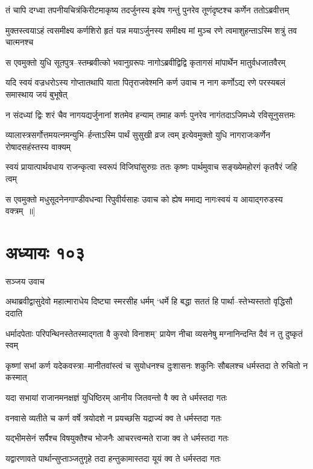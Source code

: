 \twolineshloka
{तं चापि दग्ध्वा तपनीयचित्रंकिरीटमाकृष्य तदर्जुनस्य}
{इयेष गन्तुं पुनरेव तूणंदृष्टश्च कर्णेन ततोऽब्रवीत्तम्}


\twolineshloka
{मुक्तस्त्वयाऽहं त्वसमीक्ष्य कर्णशिरो हृतं यन्न मयाऽर्जुनस्य}
{समीक्ष्य मां मुञ्च रणे त्वमाशुहन्ताऽस्मि शत्रुं तव चात्मनश्च}


\twolineshloka
{स एवमुक्तो युधि सूतपुत्र--स्तम्ब्रवीत्को भवानुग्ररूपः}
{नागोऽब्रवीद्विद्वि कृतागसं मांपार्थेन मातुर्वधजातवैरम्}


\threelineshloka
{यदि स्वयं वज्रधरोऽस्य गोप्तातथापि याता पितृराजवेश्मनि}
{कर्ण उवाच}
{न नाग कर्णोऽद्य रणे परस्यबलं समास्थाय जयं बुभूषेत्}


\twolineshloka
{न संदध्यां द्विः शरं चैव नागयद्यर्जुनानां शतमेव हन्याम्}
{तमाह कर्णः पुनरेव नागंतदाऽजिमध्ये रविसूनुसत्तमः}


\twolineshloka
{व्यालास्त्रसर्गोत्तमयत्नमन्युभि--र्हन्ताऽस्मि पार्थं सुसुखी व्रज त्वम्}
{इत्येवमुक्तो युधि नागराजःकर्णेन रोषादसहंस्तस्य वाक्यम्}


\twolineshloka
{स्वयं प्रायात्पार्थवधाय राजन्कृत्वा स्वरूपं विजिघांसुरुग्रः}
{ततः कृष्णः पार्थमुवाच सङ्ख्येमहोरगं कृतवैरं जहि त्वम्}


\twolineshloka
{स एवमुक्तो मधुसूदनेनगाण्डीवधन्वा रिपुवीर्यसाहः}
{उवाच को ह्येष ममाद्य नागःस्वयं य आयाद्गरुडस्य वक्त्रम् ॥]}


\chapter{अध्यायः १०३}
\twolineshloka
{सञ्जय उवाच}
{}


\twolineshloka
{अथाब्रवीद्वासुदेवो महात्माराधेय दिष्ट्या स्मरसीह धर्मम्}
{`धर्मे हि बद्धा सततं हि पार्था--स्तेभ्यस्ततो वृद्धिसौ ददाति}


\twolineshloka
{धर्मादपेताः परिपन्थिनस्तेतस्माद्गता वै कुरवो विनाशम्'}
{प्रायेण नीचा व्यसनेषु मग्नानिन्दन्ति दैवं न तु दुष्कृतं स्वम्}


\threelineshloka
{कृष्णां सभां कर्ण यदेकवस्त्रा--मानीतवांस्त्वं च सुयोधनश्च}
{दुःशासनः शकुनिः सौबलश्च}
{धर्मस्तदा ते रुचितो न कस्मात्}


\twolineshloka
{यदा सभायां राजानमनक्षज्ञं युधिष्ठिरम्}
{आनीय जितवन्तो वै क्व ते धर्मस्तदा गतः}


\twolineshloka
{वनवासे व्यतीते च कर्ण वर्षे त्रयोदशे}
{न प्रयच्छसि यद्राज्यं क्व ते धर्मस्तदा गतः}


\twolineshloka
{यद्भीमसेनं सर्पैश्च विषयुक्तैश्च भोजनैः}
{आचरत्त्वन्मते राजा क्व ते धर्मस्तदा गतः}


\twolineshloka
{यद्वारणावते पार्थान्सुप्ताञ्जतुगृहे तदा}
{हन्तुकामास्तदा यूयं क्व ते धर्मस्तदा गतः}


